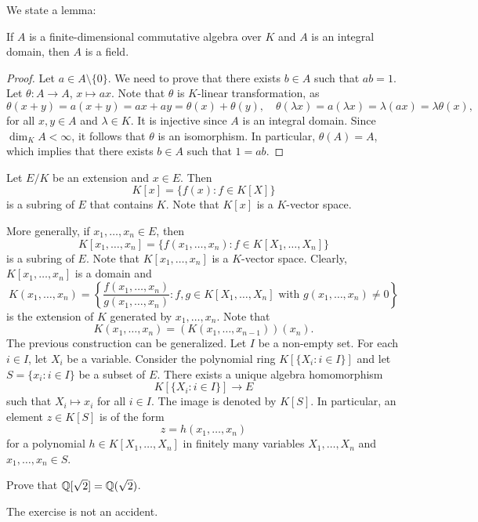 We state a lemma:

\begin{lemma}
If $A$ is a finite-dimensional commutative algebra over $K$ 
and $A$ is an integral domain, then $A$ is a field. 
\end{lemma}

\begin{proof}
	Let $a\in A\setminus\{0\}$. We need to prove that there exists $b\in A$
	such that $ab=1$. Let $\theta\colon A\to A$, $x\mapsto ax$. Note that 
	$\theta$ is $K$-linear transformation, as 
    \[
    \theta(x+y)=a(x+y)=ax+ay=\theta(x)+\theta(y),\quad
    \theta(\lambda x)=a(\lambda x)=\lambda (ax)=\lambda\theta(x),
    \]
    for all $x,y\in A$ and $\lambda\in K$. 
 It is injective since $A$ is an
	integral domain.  Since $\dim_KA<\infty$, it follows that $\theta$ is an
	isomorphism. In particular, $\theta(A)=A$, which implies that there exists
	$b\in A$ such that $1=ab$. 
\end{proof}

Let $E/K$ be an extension and $x\in E$. 
Then 
\[
K[x]=\{f(x): f\in K[X]\}
\]
is a subring of $E$ that contains $K$. Note that 
$K[x]$ is a $K$-vector space. 

More generally,
if $x_1,\dots,x_n\in E$, then
\[
K[x_1,\dots,x_n]=\{f(x_1,\dots,x_n):f\in K[X_1,\dots,X_n]\}
\]
is a subring of $E$. 
Note that $K[x_1,\dots,x_n]$ is a $K$-vector space. 
Clearly, $K[x_1,\dots,x_n]$ is a domain
and 
\[
K(x_1,\dots,x_n)=\left\{\frac{f(x_1,\dots,x_n)}{g(x_1,\dots,x_n)}:f,g\in K[X_1,\dots,X_n]\text{ with $g(x_1,\dots,x_n)\ne 0$}\right\}
\]
is the extension of $K$ generated by $x_1,\dots,x_n$. 
Note that 
\[
K(x_1,\dots,x_n)=(K(x_1,\dots,x_{n-1}))(x_n).
\]
The previous construction
can be generalized. Let $I$ be a non-empty set. 
For each $i\in I$, let $X_i$ be a variable. Consider
the polynomial ring $K[\{X_i:i\in I\}]$ and let 
$S=\{x_i:i\in I\}$ be a subset of $E$. There exists a unique 
algebra homomorphism 
\[
K[\{X_i:i\in I\}]\to E
\]
such that $X_i\mapsto x_i$ for all $i\in I$. The image 
is denoted by $K[S]$. In particular, an element $z\in K[S]$ 
is of the form 
\[
z=h(x_1,\dots,x_n)
\]
for a polynomial $h\in K[X_1,\dots,X_n]$ 
in finitely many variables $X_1,\dots,X_n$ and 
$x_1,\dots,x_n\in S$. 

\begin{exercise}
\label{xca: Q[sqrt2]=Q(sqrt2)}
    Prove that $\mathbb{Q}[\sqrt{2}]=\mathbb{Q}(\sqrt{2})$. 
\end{exercise}

The exercise is not an accident. 

